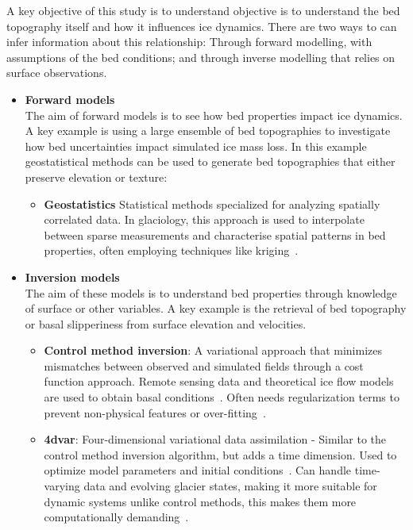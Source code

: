 A key objective of this study is to understand objective is to understand the bed topography itself and how it influences ice dynamics. There are two ways to can infer information about this relationship: Through forward modelling, with assumptions of the bed conditions; and through inverse modelling that relies on surface observations.
\begin{itemize}
    \item\textbf{Forward models}\\
    The aim of forward models is to see how bed properties impact ice dynamics. A key example is using a large ensemble of bed topographies to investigate how bed uncertainties impact simulated ice mass loss. In this example geostatistical methods can be used to generate bed topographies that either preserve elevation or texture:    
    \begin{itemize}
            \item\textbf{Geostatistics} Statistical methods specialized for analyzing spatially correlated data. In glaciology, this approach is used to interpolate between sparse measurements and characterise spatial patterns in bed properties, often employing techniques like kriging~\cite{Mackie_2020}.

    \end{itemize}

    \item\textbf{Inversion models}\\
    The aim of these models is to understand bed properties through knowledge of surface or other variables. A key example is the retrieval of bed topography or basal slipperiness from surface elevation and velocities.

        \begin{itemize}
            \item\textbf{Control method inversion}: A variational approach that minimizes mismatches between observed and simulated fields through a cost function approach. Remote sensing data and theoretical ice flow models are used to obtain basal conditions~\cite{deRydt_2013}. Often needs regularization terms to prevent non-physical features or over-fitting~\cite{Morlighem_Goldberg_2024}.

            \item\textbf{4dvar}: Four-dimensional variational data assimilation - Similar to the control method inversion algorithm, but adds a time dimension. Used to optimize model parameters and initial conditions~\cite{Morlighem_Goldberg_2024}. Can handle time-varying data and evolving glacier states, making it more suitable for dynamic systems unlike control methods, this makes them more computationally demanding~\cite{Morlighem_Goldberg_2024}.


\end{itemize}
\end{itemize}
